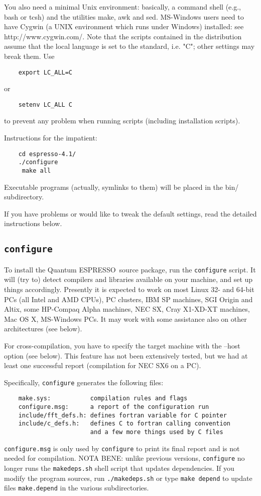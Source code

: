 \documentclass[12pt,a4paper]{article}
\def\qe{{\sc Quantum ESPRESSO}}
\begin{document}
You also need a minimal Unix environment: basically, a command shell (e.g.,
bash or tcsh) and the utilities make, awk and sed. MS-Windows users need
to have Cygwin (a UNIX environment which runs under Windows) installed:
see http://www.cygwin.com/. Note that the scripts contained in the distribution
assume that the local  language is set to the standard, i.e. "C"; other
 settings 
may break them. Use
\begin{verbatim}
    export LC_ALL=C
\end{verbatim}
or
\begin{verbatim}
    setenv LC_ALL C
\end{verbatim}
to prevent any problem when running scripts (including installation scripts).

Instructions for the impatient:
\begin{verbatim}
    cd espresso-4.1/
    ./configure
     make all
\end{verbatim}
Executable programs (actually, symlinks to them) will be placed in the bin/
subdirectory.
    
If you have problems or would like to tweak the default settings, read the
detailed instructions below.

\subsection{\texttt{configure}}

To install the \qe\ source package, run the \texttt{configure}
script. It will (try to) detect compilers and libraries available on
your machine, and set up things accordingly. Presently it is expected
to work on most Linux 32- and 64-bit PCs (all Intel and AMD CPUs), PC
clusters, IBM SP machines, SGI Origin and Altix, some HP-Compaq Alpha
machines, NEC SX, Cray X1-XD-XT machines, Mac OS X, 
MS-Windows PCs. It may work with
some assistance also on other architectures (see below). 
    
For cross-compilation, you have to specify the target machine with the
--host option (see below). This feature has not been extensively
tested, but we had at least one successful report (compilation for NEC
SX6 on a PC). 
    
Specifically, \texttt{configure} generates the following files:
\begin{verbatim}
    make.sys:           compilation rules and flags
    configure.msg:      a report of the configuration run
    include/fft_defs.h: defines fortran variable for C pointer
    include/c_defs.h:   defines C to fortran calling convention
                        and a few more things used by C files
\end{verbatim}
\texttt{configure.msg} is only used by \texttt{configure} to print its final 
report and is not needed for compilation. NOTA BENE: unlike previous
versions, \texttt{configure} no longer runs the \texttt{makedeps.sh} 
shell script that updates dependencies. If you modify the program 
sources, run \texttt{./makedeps.sh} or type \texttt{make depend}
to update files \texttt{make.depend} in the various subdirectories.
    
\end{document}
